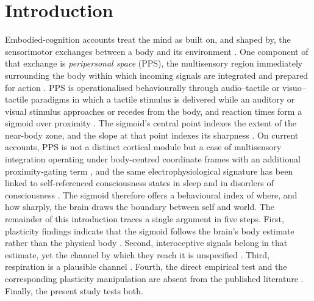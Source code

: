 \section{Introduction}

Embodied-cognition accounts treat the mind as built on, and shaped by, the sensorimotor exchanges between a body and its environment \citep{Glenberg2010, Barsalou2008, barsalou2008grounded}. One component of that exchange is \emph{peripersonal space} (PPS), the multisensory region immediately surrounding the body within which incoming signals are integrated and prepared for action \citep{rizzolatti1997space, diPellegrino2015, Serino2019, noel_2021}. PPS is operationalised behaviourally through audio--tactile or visuo--tactile paradigms in which a tactile stimulus is delivered while an auditory or visual stimulus approaches or recedes from the body, and reaction times form a sigmoid over proximity \citep{Canzoneri2012, teneggi2013social}. The sigmoid's central point indexes the extent of the near-body zone, and the slope at that point indexes its sharpness \citep{Bufacchi2018, Basile2024, Serino2019}. On current accounts, PPS is not a distinct cortical module but a case of multisensory integration operating under body-centred coordinate frames with an additional proximity-gating term \citep{noel_2018, bertoni_2025, straka_2022}, and the same electrophysiological signature has been linked to self-referenced consciousness states in sleep and in disorders of consciousness \citep{bertoni_2026}. The sigmoid therefore offers a behavioural index of where, and how sharply, the brain draws the boundary between self and world. The remainder of this introduction traces a single argument in five steps. First, plasticity findings indicate that the sigmoid follows the brain's body estimate rather than the physical body \citep{noel_2021, Serino2019}. Second, interoceptive signals belong in that estimate, yet the channel by which they reach it is unspecified \citep{Ardizzi2018, salvato_2020, bogdanova_2021}. Third, respiration is a plausible channel \citep{saltafossi_2025, allen_2021}. Fourth, the direct empirical test and the corresponding plasticity manipulation are absent from the published literature \citep{spaccasassi_2019, karakoc_2025}. Finally, the present study tests both.

